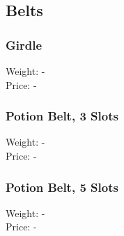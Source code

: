 \subsection{Belts}

\subsubsection{Girdle}
Weight: -\\
Price: -\\

\subsubsection{Potion Belt, 3 Slots}
Weight: -\\
Price: -\\

\subsubsection{Potion Belt, 5 Slots}
Weight: -\\
Price: -\\




